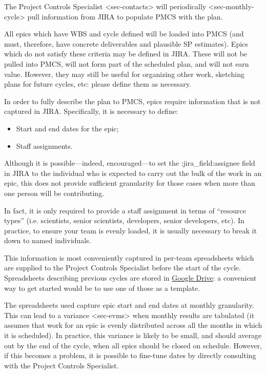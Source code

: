 The Project Controls Specialist \textless{}sec-contacts\textgreater{}
will periodically
\textless{}sec-monthly-cycle\textgreater{} pull information from JIRA to
populate PMCS with the plan.

All epics which have WBS and cycle defined will be loaded into PMCS (and
must, therefore, have concrete deliverables and plausible SP estimates).
Epics which do not satisfy these criteria may be defined in JIRA. These
will not be pulled into PMCS, will not form part of the scheduled plan,
and will not earn value. However, they may still be useful for
organizing other work, sketching plans for future cycles, etc: please
define them as necessary.

In order to fully describe the plan to PMCS, epics require information
that is not captured in JIRA. Specifically, it is necessary to define:

\begin{itemize}
\item
  Start and end dates for the epic;
\item
  Staff assignments.
\end{itemize}

Although it is possible---indeed, encouraged---to set the
:jira\_field:assignee field in JIRA to the individual who is expected to
carry out the bulk of the work in an epic, this does not provide
sufficient granularity for those cases when more than one person will be
contributing.

In fact, it is only required to provide a staff assignment in terms of
``resource types'' (i.e. scientists, senior scientists, developers,
senior developers, etc). In practice, to ensure your team is evenly
loaded, it is usually necessary to break it down to named individuals.

This information is most conveniently captured in per-team spreadsheets
which are supplied to the Project Controls Specialist before the start
of the cycle. Spreadsheets describing previous cycles are stored in
\href{https://drive.google.com/drive/u/0/folders/0BxgFbTQURmr6TmxXSm5Dc1JJWk0}{Google
Drive}: a convenient way to get started would be to use one of those as
a template.

The spreadsheets used capture epic start and end dates at monthly
granularity. This can lead to a
variance \textless{}sec-evms\textgreater{} when monthly results are
tabulated (it assumes that work for an epic is evenly distributed across
all the months in which it is scheduled). In practice, this variance is
likely to be small, and should average out by the end of the cycle, when
all epics should be closed on schedule. However, if this becomes a
problem, it is possible to fine-tune dates by directly consulting with
the Project Controls Specialist.

